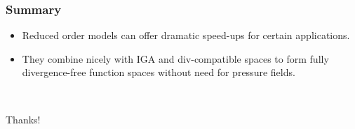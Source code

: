 \documentclass{beamer}
\begin{document}
\begin{frame}
  \frametitle{Summary}
  \begin{itemize}
  \item Reduced order models can offer dramatic speed-ups for certain applications.
  \item They combine nicely with IGA and div-compatible spaces to form fully
    divergence-free function spaces without need for pressure fields.
  \end{itemize}
  ~\\ \begin{center} Thanks! \end{center}
\end{frame}
\end{document}
